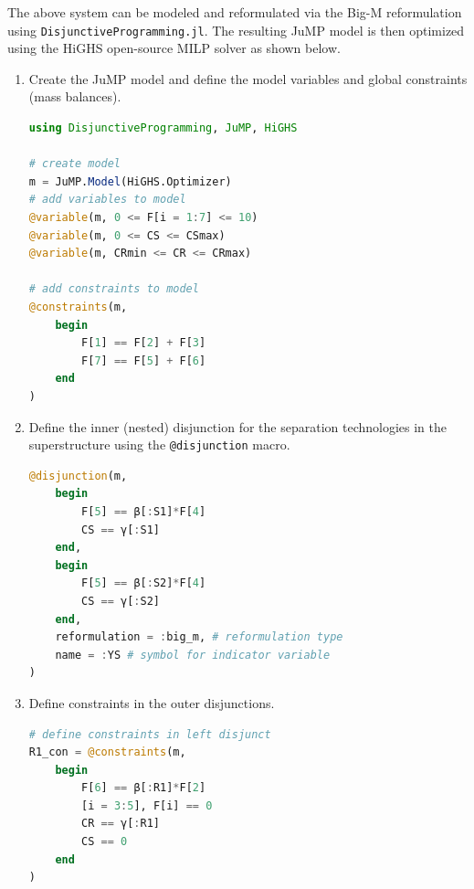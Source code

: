 \documentclass{juliacon}
\begin{document}
The above system can be modeled and reformulated via the Big-M reformulation using \verb|DisjunctiveProgramming.jl|. The resulting JuMP model is then optimized using the HiGHS open-source MILP solver \cite{huangfu2018parallelizing} as shown below.

\begin{enumerate}
    \item Create the JuMP model and define the model variables and global constraints (mass balances).
    
\begin{lstlisting}[language = Julia]
using DisjunctiveProgramming, JuMP, HiGHS

# create model
m = JuMP.Model(HiGHS.Optimizer)
# add variables to model
@variable(m, 0 <= F[i = 1:7] <= 10)
@variable(m, 0 <= CS <= CSmax)
@variable(m, CRmin <= CR <= CRmax)

# add constraints to model
@constraints(m,
    begin
        F[1] == F[2] + F[3]
        F[7] == F[5] + F[6]
    end
)
\end{lstlisting}
    \item Define the inner (nested) disjunction for the separation technologies in the superstructure using the \verb|@disjunction| macro.   
\begin{lstlisting}[language = Julia]
@disjunction(m,
    begin
        F[5] == β[:S1]*F[4]
        CS == γ[:S1]
    end,
    begin
        F[5] == β[:S2]*F[4]
        CS == γ[:S2]
    end,
    reformulation = :big_m, # reformulation type
    name = :YS # symbol for indicator variable
)
\end{lstlisting}
    \item Define constraints in the outer disjunctions.
\begin{lstlisting}[language = Julia]
# define constraints in left disjunct
R1_con = @constraints(m,
    begin
        F[6] == β[:R1]*F[2]
        [i = 3:5], F[i] == 0
        CR == γ[:R1]
        CS == 0
    end
)


\end{lstlisting}
\end{enumerate}
\end{document}
